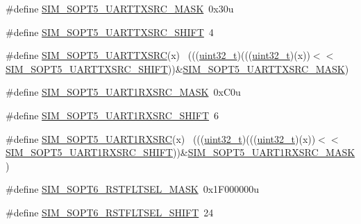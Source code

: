 \begin{DoxyCompactItemize}
\item 
\#define \hyperlink{group___s_i_m___register___masks_ga0c561aa8863d4bd4b74cd60a9e34a60f}{S\+I\+M\+\_\+\+S\+O\+P\+T5\+\_\+\+U\+A\+R\+T\+T\+X\+S\+R\+C\+\_\+\+M\+A\+SK}~0x30u
\item 
\#define \hyperlink{group___s_i_m___register___masks_gab0afb646ce85e4e10885acd0542bb4b7}{S\+I\+M\+\_\+\+S\+O\+P\+T5\+\_\+\+U\+A\+R\+T\+T\+X\+S\+R\+C\+\_\+\+S\+H\+I\+FT}~4
\item 
\#define \hyperlink{group___s_i_m___register___masks_gac1ff4ddb8d874b4451afa10e5c8d22df}{S\+I\+M\+\_\+\+S\+O\+P\+T5\+\_\+\+U\+A\+R\+T\+T\+X\+S\+RC}(x)                                  ~(((\hyperlink{_p_e___types_8h_a33594304e786b158f3fb30289278f5af}{uint32\+\_\+t})(((\hyperlink{_p_e___types_8h_a33594304e786b158f3fb30289278f5af}{uint32\+\_\+t})(x))$<$$<$\hyperlink{group___s_i_m___register___masks_gab0afb646ce85e4e10885acd0542bb4b7}{S\+I\+M\+\_\+\+S\+O\+P\+T5\+\_\+\+U\+A\+R\+T\+T\+X\+S\+R\+C\+\_\+\+S\+H\+I\+FT}))\&\hyperlink{group___s_i_m___register___masks_ga0c561aa8863d4bd4b74cd60a9e34a60f}{S\+I\+M\+\_\+\+S\+O\+P\+T5\+\_\+\+U\+A\+R\+T\+T\+X\+S\+R\+C\+\_\+\+M\+A\+SK})
\item 
\#define \hyperlink{group___s_i_m___register___masks_gaf34eb14baf5894693130af7addd8aa6f}{S\+I\+M\+\_\+\+S\+O\+P\+T5\+\_\+\+U\+A\+R\+T1\+R\+X\+S\+R\+C\+\_\+\+M\+A\+SK}~0x\+C0u
\item 
\#define \hyperlink{group___s_i_m___register___masks_ga098fcb3123342f9cd96869c69d2fb7a9}{S\+I\+M\+\_\+\+S\+O\+P\+T5\+\_\+\+U\+A\+R\+T1\+R\+X\+S\+R\+C\+\_\+\+S\+H\+I\+FT}~6
\item 
\#define \hyperlink{group___s_i_m___register___masks_ga49ea8079e7dc9fbf82dee1acca0cdf10}{S\+I\+M\+\_\+\+S\+O\+P\+T5\+\_\+\+U\+A\+R\+T1\+R\+X\+S\+RC}(x)                                ~(((\hyperlink{_p_e___types_8h_a33594304e786b158f3fb30289278f5af}{uint32\+\_\+t})(((\hyperlink{_p_e___types_8h_a33594304e786b158f3fb30289278f5af}{uint32\+\_\+t})(x))$<$$<$\hyperlink{group___s_i_m___register___masks_ga098fcb3123342f9cd96869c69d2fb7a9}{S\+I\+M\+\_\+\+S\+O\+P\+T5\+\_\+\+U\+A\+R\+T1\+R\+X\+S\+R\+C\+\_\+\+S\+H\+I\+FT}))\&\hyperlink{group___s_i_m___register___masks_gaf34eb14baf5894693130af7addd8aa6f}{S\+I\+M\+\_\+\+S\+O\+P\+T5\+\_\+\+U\+A\+R\+T1\+R\+X\+S\+R\+C\+\_\+\+M\+A\+SK})
\item 
\#define \hyperlink{group___s_i_m___register___masks_ga3af8833f5e7ea733eb6b46a8bf1aaec0}{S\+I\+M\+\_\+\+S\+O\+P\+T6\+\_\+\+R\+S\+T\+F\+L\+T\+S\+E\+L\+\_\+\+M\+A\+SK}~0x1\+F000000u
\item 
\#define \hyperlink{group___s_i_m___register___masks_gadc37bd1fea7eccbbef05b7cbaf85910b}{S\+I\+M\+\_\+\+S\+O\+P\+T6\+\_\+\+R\+S\+T\+F\+L\+T\+S\+E\+L\+\_\+\+S\+H\+I\+FT}~24

\end{DoxyCompactItemize}
